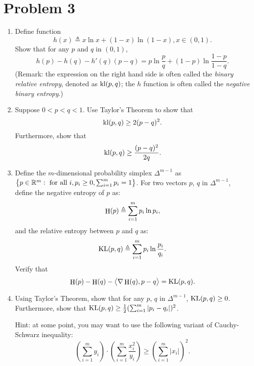 \documentclass{article}
\DeclareMathOperator*{\kl}{{\rm kl}}
\DeclareMathOperator*{\KL}{{\rm KL}}
\DeclareMathOperator*{\nent}{{\rm H}}
\newcommand{\RR}{\mathbb{R}} %
\newcommand{\defeq}{\triangleq}
\newcommand{\inner}[2]{\left\langle #1,#2 \right\rangle}
\begin{document}
\section*{Problem 3}
\begin{enumerate}
\item Define function
\[ h(x) \defeq x \ln x + (1-x) \ln (1-x), x \in (0,1). \]
Show that for any $p$ and $q$ in $(0,1)$,
\[ h(p) - h(q) - h'(q)(p - q)
   = p \ln \frac{p}{q} + (1-p) \ln \frac{1-p}{1-q}. \]
(Remark: the expression on the right hand side is often called the {\em binary relative
entropy}, denoted as $\kl(p,q)$; the $h$ function is often called the {\em negative
binary entropy}.)

\item Suppose $0 < p < q < 1$.
Use Taylor's Theorem to show that
\[ \kl(p,q) \geq 2(p-q)^2. \]
Furthermore, show that
\[ \kl(p,q) \geq \frac{(p-q)^2}{2q}. \]

\item Define the $m$-dimensional probability simplex
$\Delta^{m-1}$ as $\cbr{p \in \RR^m: \text{ for all } i, p_i \geq 0,
\sum_{i=1}^m p_i = 1}$. For two vectors $p$, $q$ in $\Delta^{m-1}$,
define the negative entropy of $p$ as:
\[ \nent(p) \defeq \sum_{i=1}^m p_i \ln p_i, \]
and the relative entropy between $p$ and $q$ as:
\[ \KL(p, q) \defeq \sum_{i=1}^m p_i \ln \frac{p_i}{q_i}. \]
Verify that
\[ \nent(p) - \nent(q) - \inner{\nabla \nent(q)}{p - q} = \KL(p, q). \]

\item Using Taylor's Theorem, show that for any $p$, $q$ in $\Delta^{m-1}$,
$\KL(p,q) \geq 0$.
Furthermore, show that
$\KL(p,q) \geq \frac{1}{2} (\sum_{i=1}^m |p_i - q_i|)^2$.

Hint: at some point, you may want to use the following variant of Cauchy-Schwarz
inequality:
\[
(\sum_{i=1}^m y_i) \cdot (\sum_{i=1}^m \frac{x_i^2}{y_i}) \geq (\sum_{i=1}^m |x_i|)^2.
\]
\end{enumerate}
\end{document}
